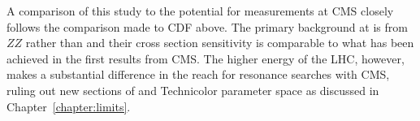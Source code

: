 A comparison of this \dzero{} study to the potential for measurements at CMS closely follows the comparison made to CDF above.  The primary background at \dzero{} is from $ZZ$ rather than \Zjets and their cross section sensitivity is comparable to what has been achieved in the first results from CMS.  The higher energy of the LHC, however, makes a substantial difference in the reach for resonance searches with CMS, ruling out new sections of \wprime{} and Technicolor parameter space as discussed in Chapter~\ref{chapter:limits}.



